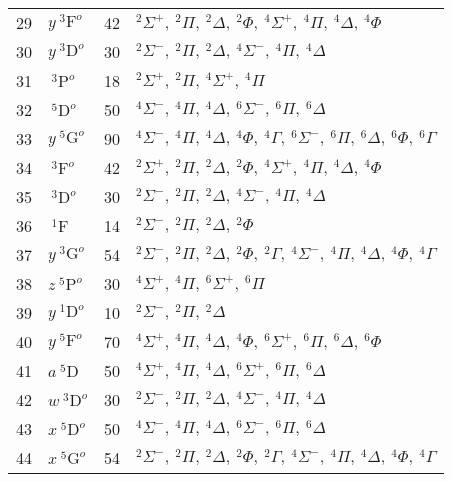 \begin{table*}[]
\begin{tabular*}{\textwidth}{llll@{\extracolsep{\fill}}}
  29 & $ y~^3\mathrm{F}^o $ &   42& $   ^{2}\Sigma^+,\  ^{2}\Pi,\     ^{2}\Delta,\ ^{2}\Phi,\   ^{4}\Sigma^+,\  ^{4}\Pi,\     ^{4}\Delta,\ ^{4}\Phi$ \\
  30 & $ y~^3\mathrm{D}^o $ &   30& $   ^{2}\Sigma^-,\  ^{2}\Pi,\     ^{2}\Delta,\   ^{4}\Sigma^-,\  ^{4}\Pi,\     ^{4}\Delta$ \\
 31 & $  ~^3\mathrm{P}^o $ &   18& $   ^{2}\Sigma^+,\  ^{2}\Pi,\   ^{4}\Sigma^+,\  ^{4}\Pi$ \\
 32 & $  ~^5\mathrm{D}^o $ &   50& $   ^{4}\Sigma^-,\  ^{4}\Pi,\     ^{4}\Delta,\   ^{6}\Sigma^-,\  ^{6}\Pi,\     ^{6}\Delta$ \\
 33 & $ y~^5\mathrm{G}^o $ &   90& $   ^{4}\Sigma^-,\  ^{4}\Pi,\     ^{4}\Delta,\ ^{4}\Phi,\     ^{4}\Gamma,\   ^{6}\Sigma^-,\  ^{6}\Pi,\     ^{6}\Delta,\ ^{6}\Phi,\     ^{6}\Gamma$ \\
 34 & $  ~^3\mathrm{F}^o $ &   42& $   ^{2}\Sigma^+,\  ^{2}\Pi,\     ^{2}\Delta,\ ^{2}\Phi,\   ^{4}\Sigma^+,\  ^{4}\Pi,\     ^{4}\Delta,\ ^{4}\Phi$ \\
 35 & $  ~^3\mathrm{D}^o $ &   30& $   ^{2}\Sigma^-,\  ^{2}\Pi,\     ^{2}\Delta,\   ^{4}\Sigma^-,\  ^{4}\Pi,\     ^{4}\Delta$ \\
 36 & $    ~^1\mathrm{F} $ &   14& $   ^{2}\Sigma^-,\  ^{2}\Pi,\     ^{2}\Delta,\ ^{2}\Phi$ \\
 37 & $ y~^3\mathrm{G}^o $ &   54& $   ^{2}\Sigma^-,\  ^{2}\Pi,\     ^{2}\Delta,\ ^{2}\Phi,\     ^{2}\Gamma,\   ^{4}\Sigma^-,\  ^{4}\Pi,\     ^{4}\Delta,\ ^{4}\Phi,\     ^{4}\Gamma$ \\
 38 & $ z~^5\mathrm{P}^o $ &   30& $   ^{4}\Sigma^+,\  ^{4}\Pi,\   ^{6}\Sigma^+,\  ^{6}\Pi$ \\
 39 & $ y~^1\mathrm{D}^o $ &   10& $   ^{2}\Sigma^-,\  ^{2}\Pi,\     ^{2}\Delta$ \\
 40 & $ y~^5\mathrm{F}^o $ &   70& $   ^{4}\Sigma^+,\  ^{4}\Pi,\     ^{4}\Delta,\ ^{4}\Phi,\   ^{6}\Sigma^+,\  ^{6}\Pi,\     ^{6}\Delta,\ ^{6}\Phi$ \\
 41 & $   a~^5\mathrm{D} $ &   50& $   ^{4}\Sigma^+,\  ^{4}\Pi,\     ^{4}\Delta,\   ^{6}\Sigma^+,\  ^{6}\Pi,\     ^{6}\Delta$ \\
 42 & $ w~^3\mathrm{D}^o $ &   30& $   ^{2}\Sigma^-,\  ^{2}\Pi,\     ^{2}\Delta,\   ^{4}\Sigma^-,\  ^{4}\Pi,\     ^{4}\Delta$ \\
 43 & $ x~^5\mathrm{D}^o $ &   50& $   ^{4}\Sigma^-,\  ^{4}\Pi,\     ^{4}\Delta,\   ^{6}\Sigma^-,\  ^{6}\Pi,\     ^{6}\Delta$ \\
 44 & $ x~^5\mathrm{G}^o $ &   54& $   ^{2}\Sigma^-,\  ^{2}\Pi,\     ^{2}\Delta,\ ^{2}\Phi,\     ^{2}\Gamma,\   ^{4}\Sigma^-,\  ^{4}\Pi,\     ^{4}\Delta,\ ^{4}\Phi,\     ^{4}\Gamma$ \\

\end{tabular*}
\end{table*}
